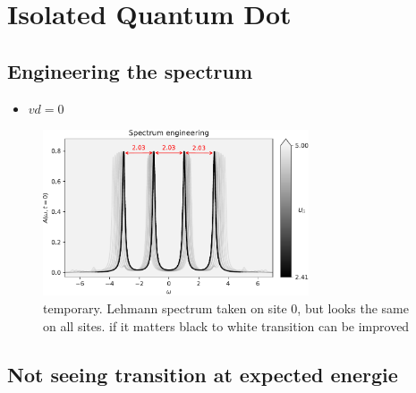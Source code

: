 \section{Isolated Quantum Dot}
\subsection{Engineering the spectrum}
\begin{itemize}
    \item $vd= 0$
\end{itemize}

\begin{figure}[!hbt]
    \centering
    \includegraphics[width=0.7\textwidth]{graph/spectrum_engineering.pdf}
    \caption{temporary. Lehmann spectrum taken on site 0, but looks the same on all sites. if it matters black to white transition can be improved}
\end{figure}

\subsection{Not seeing transition at expected energie}
